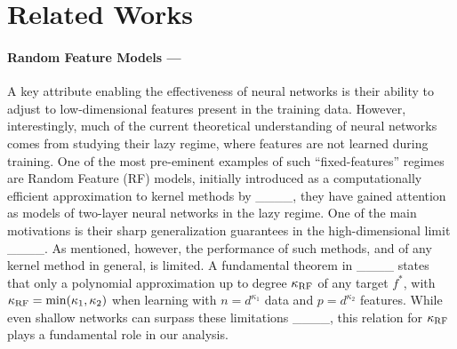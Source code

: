 \section{Related Works}
\vspace{-0.1cm}
\paragraph {Random Feature Models ---} A key attribute enabling the effectiveness of neural networks is their ability to adjust to low-dimensional features present in the training data. However, interestingly, much of the current theoretical understanding of neural networks comes from studying their lazy regime, where features are not learned during training. One of the most pre-eminent examples of such ``fixed-features'' regimes are Random Feature (RF) models, initially introduced as a computationally efficient approximation to kernel methods by ____, they have gained attention as models of two-layer neural networks in the lazy regime. One of the main motivations is their sharp generalization guarantees in the high-dimensional limit ____. As mentioned, however, the performance of such methods, and of any kernel method in general, is limited. A fundamental theorem in ____ states that only a polynomial approximation up to degree $\kappa_{\rm RF}$ of any target $f^*$, with $\kappa_{\rm RF} = {\rm min} (\kappa_1,\kappa_2)$ when learning with $n=d^{\kappa_1}$ data and $p=d^{\kappa_2}$ features. While even shallow networks can surpass these limitations ____, this relation for $\kappa_{\rm RF}$ plays a fundamental role in our analysis. 

